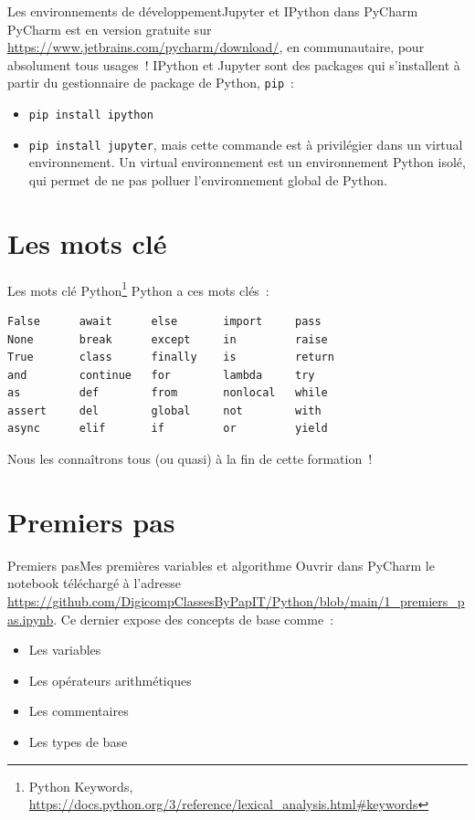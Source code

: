 \documentclass{beamer}
\begin{document}
    \begin{frame}{Les environnements de développement}{Jupyter et IPython dans PyCharm}
        PyCharm est en version gratuite sur \url{https://www.jetbrains.com/pycharm/download/}, en communautaire, pour absolument tous usages~!
        \bigbreak
        IPython et Jupyter sont des packages qui s'installent à partir du gestionnaire de package de Python, \lstinline{pip}~:
        \begin{itemize}
            \item \lstinline{pip install ipython}
            \item \lstinline{pip install jupyter}, mais cette commande est à privilégier dans un virtual environnement.
            Un virtual environnement est un environnement Python isolé, qui permet de ne pas polluer l'environnement global de Python.
        \end{itemize}
    \end{frame}


    \section{Les mots clé}\label{sec:keyword}

    \begin{frame}[fragile]{Les mots clé Python\footnote{Python Keywords, \url{https://docs.python.org/3/reference/lexical_analysis.html\#keywords}}}
        Python a ces mots clés~:
        \begin{verbatim}
False      await      else       import     pass
None       break      except     in         raise
True       class      finally    is         return
and        continue   for        lambda     try
as         def        from       nonlocal   while
assert     del        global     not        with
async      elif       if         or         yield
        \end{verbatim}
        Nous les connaîtrons tous (ou quasi) à la fin de cette formation~!
    \end{frame}


    \section{Premiers pas}\label{sec:first-steps}
    \begin{frame}{Premiers pas}{Mes premières variables et algorithme}
        Ouvrir dans PyCharm le notebook téléchargé à l'adresse \url{https://github.com/DigicompClassesByPapIT/Python/blob/main/1_premiers_pas.ipynb}.
        \bigbreak
        Ce dernier expose des concepts de base comme~:
        \begin{itemize}
            \item Les variables
            \item Les opérateurs arithmétiques
            \item Les commentaires
            \item Les types de base
        \end{itemize}
    \end{frame}
\end{document}
